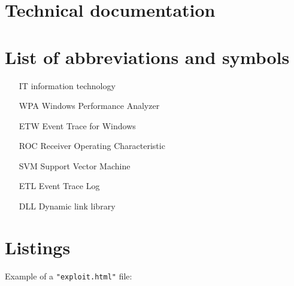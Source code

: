 \documentclass[a4paper,twoside,12pt]{book}
\begin{document}
\begin{appendices} 


\chapter*{Technical documentation}

\chapter*{List of abbreviations and symbols}

\begin{itemize}
\item[IT] information technology
\item[WPA] Windows Performance Analyzer 
\item[ETW] Event Trace for Windows 
\item[ROC] Receiver Operating Characteristic
\item[SVM] Support Vector Machine 
\item[ETL] Event Trace Log 
\item[DLL] Dynamic link library 
\end{itemize}

\chapter*{Listings}

   
Example of a \lstinline|"exploit.html"| file:


\end{appendices}
\end{document}
